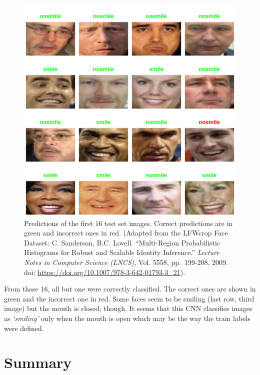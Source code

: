 \documentclass[
  11pt,
]{krantz}
\begin{document}
\begin{figure}

{\centering \includegraphics[width=0.9\linewidth]{images/cnn_smile_predictions} 

}

\caption{Predictions of the first \(16\) test set images. Correct predictions are in green and incorrect ones in red. (Adapted from the LFWcrop Face Dataset: C. Sanderson, B.C. Lovell. ``Multi-Region Probabilistic Histograms for Robust and Scalable Identity Inference.'' \emph{Lecture Notes in Computer Science (LNCS)}, Vol. 5558, pp.~199-208, 2009. doi: \url{https://doi.org/10.1007/978-3-642-01793-3_21}).}\label{fig:cnnSmileResults}
\end{figure}

From those \(16\), all but one were correctly classified. The correct ones are shown in green and the incorrect one in red. Some faces seem to be smiling (last row, third image) but the mouth is closed, though. It seems that this CNN classifies images as \emph{`smiling'} only when the mouth is open which may be the way the train labels were defined.

\newpage

\hypertarget{SummaryDeepLearning}{%
\section{Summary}\label{SummaryDeepLearning}}
\end{document}
